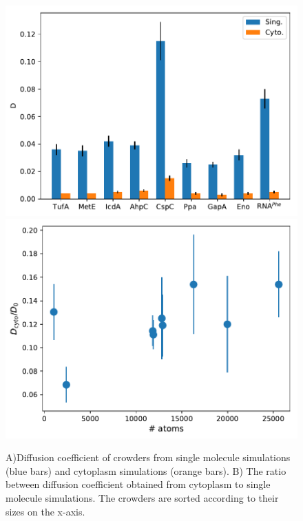 \documentclass[journal=jacsat,manuscript=article]{achemso}
\begin{document}
\begin{figure}[H]
\includegraphics[scale=0.5]{msd.pdf}
\includegraphics[scale=0.5]{diff_cyto_over_singles.pdf}
\caption{A)Diffusion coefficient of crowders from single molecule simulations (blue bars) and cytoplasm simulations (orange bars). B) The ratio between diffusion coefficient obtained from cytoplasm to single molecule simulations. The crowders are sorted according to their sizes on the x-axis.}
\label{fig:translational_diffusion}
\end{figure}

\end{document}
